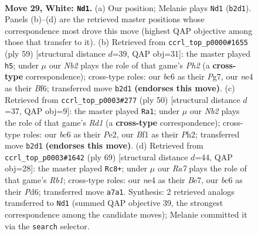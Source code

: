 \documentclass[11pt]{article}
\begin{document}
\clearpage

\begin{figure}[p]\centering
\begin{subfigure}{0.46\textwidth}\centering
\resizebox{\linewidth}{!}{%
\newchessgame
\chessboard[
  setfen={6k1/R4pp1/2b1p3/1p5p/1P1PnP1P/2r3P1/1N2P3/5BK1 w - - 1 29},
  showmover=false,
  pgfstyle=straightmove, color=movearrow, markmove={b2-d1}
]}
\caption{}
\end{subfigure}\hfill
\begin{subfigure}{0.46\textwidth}\centering
\resizebox{\linewidth}{!}{%
\newchessgame
\chessboard[
  setfen={2r5/p5pp/1p2kb2/n2p4/P2P1B2/2PK4/3N2PP/5R2 b - - 4 30},
  showmover=false,
  pgfstyle=straightmove, color=movearrow, markmove={h7-h5}
]}
\caption{}
\end{subfigure}
\\[4pt]
\begin{subfigure}{0.46\textwidth}\centering
\resizebox{\linewidth}{!}{%
\newchessgame
\chessboard[
  setfen={1r4k1/2N1bpp1/4p3/2n1P2p/2p5/4B1P1/1P2PP1P/3R2K1 w - - 1 26},
  showmover=false,
  pgfstyle=straightmove, color=movearrow, markmove={d1-a1}
]}
\caption{}
\end{subfigure}\hfill
\begin{subfigure}{0.46\textwidth}\centering
\resizebox{\linewidth}{!}{%
\newchessgame
\chessboard[
  setfen={1r6/3nbk2/3p3p/R3p3/4Pp1P/1PK2P2/5B2/4N3 b - - 8 35},
  showmover=false,
  pgfstyle=straightmove, color=movearrow, markmove={b8-c8}
]}
\caption{}
\end{subfigure}
\caption{\textbf{Move 29, White: \texttt{Nd1}.} (a) Our position; Melanie plays \texttt{Nd1} (\texttt{b2d1}). Panels (b)--(d) are the retrieved master positions whose correspondence most drove this move (highest QAP objective among those that transfer to it). (b) Retrieved from \texttt{ccrl\_top\_p0000\#1655} (ply 59) [structural distance $d$=39, QAP obj=31]: the master played \texttt{h5}; under $\mu$ our \emph{Nb2} plays the role of that game's \emph{Ph2} (a \textbf{cross-type} correspondence); cross-type roles: our \emph{b}c6 as their \emph{P}g7, our \emph{n}e4 as their \emph{B}f6; transferred move \texttt{b2d1} \textbf{(endorses this move)}. (c) Retrieved from \texttt{ccrl\_top\_p0003\#277} (ply 50) [structural distance $d$=37, QAP obj=9]: the master played \texttt{Ra1}; under $\mu$ our \emph{Nb2} plays the role of that game's \emph{Rd1} (a \textbf{cross-type} correspondence); cross-type roles: our \emph{b}c6 as their \emph{P}e2, our \emph{B}f1 as their \emph{P}h2; transferred move \texttt{b2d1} \textbf{(endorses this move)}. (d) Retrieved from \texttt{ccrl\_top\_p0003\#1642} (ply 69) [structural distance $d$=44, QAP obj=28]: the master played \texttt{Rc8+}; under $\mu$ our \emph{Ra7} plays the role of that game's \emph{Rb1}; cross-type roles: our \emph{n}e4 as their \emph{B}e7, our \emph{b}c6 as their \emph{P}d6; transferred move \texttt{a7a1}. Synthesis: 2 retrieved analogs transferred to \texttt{Nd1} (summed QAP objective 39, the strongest correspondence among the candidate moves); Melanie committed it via the \texttt{search} selector.}
\label{fig:thought-m56}
\end{figure}
\end{document}
